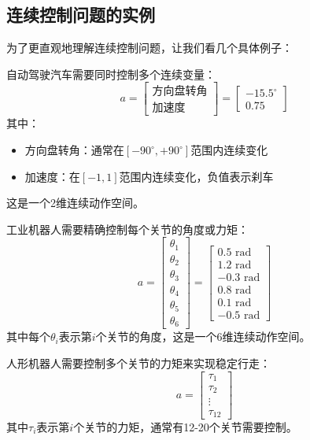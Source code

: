 \subsection{连续控制问题的实例}

为了更直观地理解连续控制问题，让我们看几个具体例子：

\begin{example}[自动驾驶]
自动驾驶汽车需要同时控制多个连续变量：
\[
a = \begin{bmatrix}
\text{方向盘转角} \\ \text{加速度}
\end{bmatrix} = \begin{bmatrix}
-15.5^\circ \\ 0.75
\end{bmatrix}
\]
其中：
\begin{itemize}
    \item 方向盘转角：通常在$[-90^\circ, +90^\circ]$范围内连续变化
    \item 加速度：在$[-1, 1]$范围内连续变化，负值表示刹车
\end{itemize}
这是一个2维连续动作空间。
\end{example}

\begin{example}[6自由度机械臂控制]
工业机器人需要精确控制每个关节的角度或力矩：
\[
a = \begin{bmatrix}
\theta_1 \\ \theta_2 \\ \theta_3 \\ \theta_4 \\ \theta_5 \\ \theta_6
\end{bmatrix} = \begin{bmatrix}
0.5 \text{ rad} \\ 1.2 \text{ rad} \\ -0.3 \text{ rad} \\ 0.8 \text{ rad} \\ 0.1 \text{ rad} \\ -0.5 \text{ rad}
\end{bmatrix}
\]
其中每个$\theta_i$表示第$i$个关节的角度，这是一个6维连续动作空间。
\end{example}

\begin{example}[人形机器人行走]
人形机器人需要控制多个关节的力矩来实现稳定行走：
\[
a = \begin{bmatrix}
\tau_1 \\ \tau_2 \\ \vdots \\ \tau_{12}
\end{bmatrix}
\]
其中$\tau_i$表示第$i$个关节的力矩，通常有12-20个关节需要控制。
\end{example}

